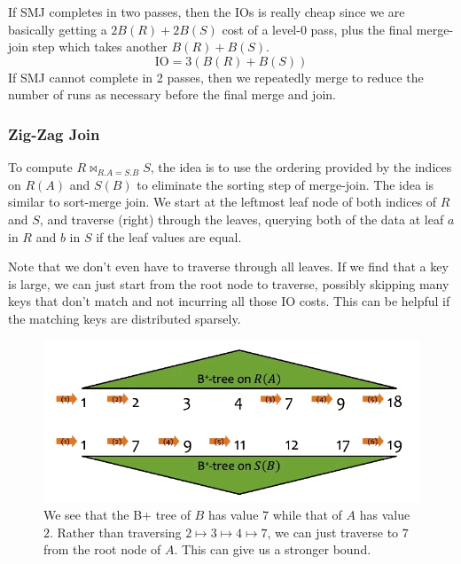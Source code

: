     \begin{example} 
      If SMJ completes in two passes, then the IOs is really cheap since we are basically getting a $2 B(R) + 2 B(S)$ cost of a level-0 pass, plus the final merge-join step which takes another $B(R) + B(S)$. 
      \begin{equation}
        \mathrm{IO} = 3 ( B(R) + B(S)) 
      \end{equation}
      If SMJ cannot complete in 2 passes, then we repeatedly merge to reduce the number of runs as necessary before the final merge and join. 
    \end{example}

  \subsubsection{Zig-Zag Join} 

    \begin{definition}
      To compute $R \bowtie_{R.A = S.B} S$, the idea is to use the ordering provided by the indices on $R(A)$ and $S(B)$ to eliminate the sorting step of merge-join. The idea is similar to sort-merge join. We start at the leftmost leaf node of both indices of $R$ and $S$, and traverse (right) through the leaves, querying both of the data at leaf $a$ in $R$ and $b$ in $S$ if the leaf values are equal. 

      Note that we don't even have to traverse through all leaves. If we find that a key is large, we can just start from the root node to traverse, possibly skipping many keys that don't match and not incurring all those IO costs. This can be helpful if the matching keys are distributed sparsely.

      \begin{figure}[H]
        \centering 
        \includegraphics[scale=0.4]{img/zig_zag.png}
        \caption{We see that the B+ tree of $B$ has value $7$ while that of $A$ has value $2$. Rather than traversing $2 \mapsto 3 \mapsto 4 \mapsto 7$, we can just traverse to $7$ from the root node of $A$. This can give us a stronger bound. } 
        \label{fig:zig_zag}
      \end{figure}
    \end{definition}

